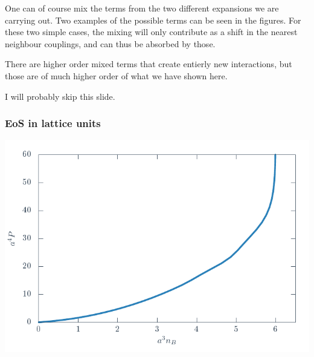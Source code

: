 \documentclass[12pt,a4paper,dvipsnames,usenames,handout]{beamer}
\begin{document}
\begin{frame}
  \note
  {
    One can of course mix the terms from the two different expansions we are carrying out. Two examples of the possible terms can
    be seen in the figures. For these two simple cases, the mixing will only contribute as a shift in the nearest neighbour
    couplings, and can thus be absorbed by those.

    \vspace{1em}

    There are higher order mixed terms that create entierly new interactions, but those are of much higher order of what we have
    shown here.

    \vspace{1em}

    I will probably skip this slide.
  }

\end{frame}

\begin{frame}
  \frametitle{EoS in lattice units}
  {\centering%
    \includegraphics[width=\textwidth]{Figs/eos_lattice_units.pdf}
  \par}
\end{frame}
\end{document}
